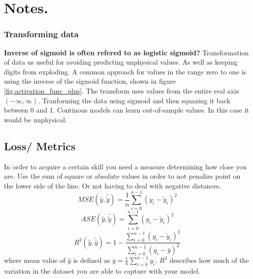 
\section{Notes.}

\subsubsection{Transforming data} \label{sec:transforming_cloud_cover}
\textbf{Inverse of sigmoid is often refered to as logistic sigmoid?}
Transformation of data us useful for avoiding predicting unphysical values. As well as keeping digits from exploding.
A common approach for values in the range zero to one is using the inverse of the sigmoid function, shown in figure \ref{fig:activation_func_plus}. The transform uses values from the entire real axis $(-\infty, \infty)$. 
%
Tranforming the data using sigmoid and then squazing it back between 0 and 1. 
Continous models can learn out-of-sample values. In this case it would be unphysical.

\subsection{Loss/ Metrics}  \label{sec:metrics}
In order to acquire a certain skill you need a measure determining how close you are. 
Use the sum of square or absolute values in order to not penalize point on the lower side of the line. Or not having to deal with negative distances. 
\begin{equation} \label{eq:mse}
    MSE(\hat{y},\hat{\tilde{y}}) = \frac{1}{n} \sum_{i=0}^{n-1}(y_i-\tilde{y}_i)^2
\end{equation} 
\begin{equation} \label{eq:ase}
    ASE(\hat{y},\hat{\tilde{y}}) =  \sum_{i=0}^{n-1}(y_i-\tilde{y}_i)^2
\end{equation} 
\begin{equation} \label{eq:r2}
    R^2(\hat{y}, \tilde{\hat{y}}) = 1 - \frac{\sum_{i=0}^{n - 1} (y_i - \tilde{y}_i)^2}{\sum_{i=0}^{n - 1} (y_i - \bar{y})^2}
\end{equation} 
where mean value of $\hat{y}$ is defined as $\bar{y} =  \frac{1}{n} \sum_{i=0}^{n - 1} y_i$. $R^2$ describes how much of the variation in the dataset you are able to capture with your model.

